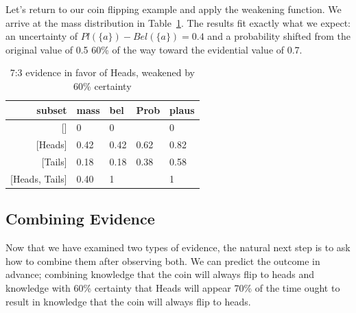 \documentclass[letterpaper]{article}
\begin{document}
Let's return to our coin flipping example and apply the weakening function.  We arrive at the mass distribution in Table~\ref{tab:CoinFlipWeakened}.  The results fit exactly what we expect: an uncertainty of $Pl(\{a\})-Bel(\{a\})=0.4$ and a probability shifted from the original value of 0.5 60\% of the way toward the evidential value of 0.7.
\begin{table}[htbp]
\centering
\caption{7:3 evidence in favor of Heads, weakened by 60\% certainty}
\begin{tabular}{rllll}
\toprule
                subset&mass &bel  &Prob &plaus\\
\midrule
                    {[]}&0    &0    &     &0    \\
               {[Heads]}&0.42&0.42&0.62&0.82\\
               {[Tails]}&0.18&0.18&0.38&0.58\\
        {[Heads, Tails]}&0.40&1    &     &1    \\
\bottomrule
\end{tabular}
\label{tab:CoinFlipWeakened}
\end{table}

\subsection{Combining Evidence}
Now that we have examined two types of evidence, the natural next step is to ask how to combine them after observing both.  We can predict the outcome in advance; combining knowledge that the coin will always flip to heads and knowledge with 60\% certainty that Heads will appear 70\% of the time ought to result in knowledge that the coin will always flip to heads.  
\end{document}
